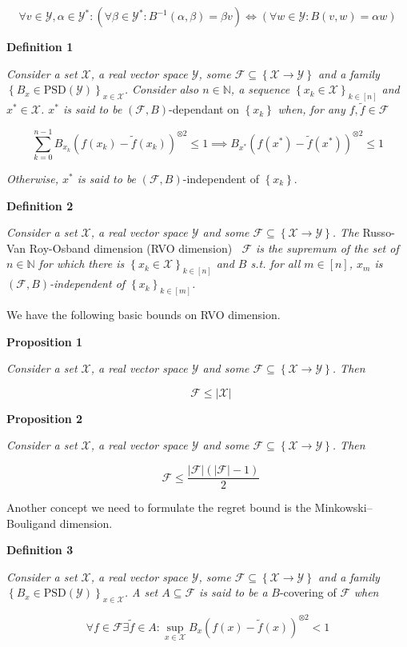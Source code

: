 \documentclass[a4paper]{article}
\newcommand{\Co}[1]{}
\newcommand{\AP}[1]{\left(#1\right)}
\newcommand{\AC}[1]{\left\{#1\right\}}
\newcommand{\Nats}{\mathbb{N}}
\newcommand{\PSD}{\mathrm{PSD}}
\newcommand{\Abs}[1]{\left\vert #1 \right\vert}
\newcommand{\B}{B}
\newcommand{\X}{\mathcal{X}}
\newcommand{\Y}{\mathcal{Y}}
\newcommand{\F}{\mathcal{F}}
\DeclareMathOperator{\RVO}{\dim_{RVO}}
\begin{document}
$$\forall v\in\Y,\alpha\in\Y^*:\AP{\forall\beta\in\Y^*:\B ^{-1}(\alpha,\beta)=\beta v}\iff\AP{\forall w\in\Y:\B (v,w)=\alpha w}$$ 

\textbf{Definition 1}\Co{b}

\textit{Consider a set $\X$, a real vector space $\Y$, some $\F\subseteq\AC{\X\rightarrow\Y}$ and a family $\AC{\B _x\in\PSD(\Y)}_{x\in\X}$. Consider also $n\in\Nats$, a sequence $\AC{x_k\in\X}_{k\in[n]}$ and $x^*\in\X$. $x^*$ is said to be} $\AP{\F,\B }$-dependant on $\AC{x_k}$ \textit{when, for any $f,\tilde{f}\in\F$}\Co{i}

$$\sum_{k=0}^{n-1}\B _{x_k}\AP{f\AP{x_k}-\tilde{f}\AP{x_k}}^{\otimes 2}\leq1\implies \B _{x^*}\AP{f\AP{x^*}-\tilde{f}\AP{x^*}}^{\otimes 2}\leq1$$

\textit{Otherwise, $x^*$ is said to be}\Co{i} $\AP{\F,\B }$-independent of $\AC{x_k}$.

\textbf{Definition 2}\Co{b}

\textit{Consider a set $\X$, a real vector space $\Y$ and some $\F\subseteq\AC{\X\rightarrow\Y}$. The}\Co{i} Russo-Van Roy-Osband dimension (RVO dimension) $\RVO{\F}$ \textit{is the supremum of the set of $n\in\Nats$ for which there is $\AC{x_k\in\X}_{k\in[n]}$ and $\B $ s.t. for all $m\in[n]$, $x_m$ is $\AP{\F,\B }$-independent of $\AC{x_k}_{k\in[m]}$.}\Co{i}

We have the following basic bounds on RVO dimension.

\textbf{Proposition 1}\Co{b}

\textit{Consider a set $\X$, a real vector space $\Y$ and some $\F\subseteq\AC{\X\rightarrow\Y}$. Then}\Co{i}

$$\RVO{\F}\leq\Abs{\X}$$

\textbf{Proposition 2}\Co{b}

\textit{Consider a set $\X$, a real vector space $\Y$ and some $\F\subseteq\AC{\X\rightarrow\Y}$. Then}\Co{i}

$$\RVO{\F}\leq\frac{\Abs{\F}\AP{\Abs{\F}-1}}{2}$$

Another concept we need to formulate the regret bound is the Minkowski–Bouligand dimension.

\textbf{Definition 3}\Co{b}

\textit{Consider a set $\X$, a real vector space $\Y$, some $\F\subseteq\AC{\X\rightarrow\Y}$ and a family $\AC{\B _x\in\PSD(\Y)}_{x\in\X}$. A set $A\subseteq\F$ is said to be a}\Co{i} $\B $-covering of $\F$ \textit{when}\Co{i}

$$\forall f\in\F\exists\tilde{f}\in A: \sup_{x\in\X}{\B _x\AP{f(x)-\tilde{f}(x)}^{\otimes 2}}<1$$
\end{document}
